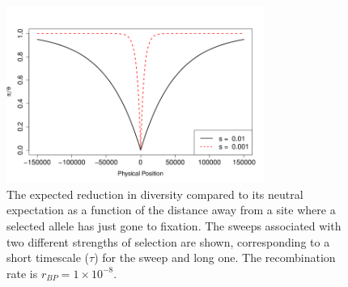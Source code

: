 \begin{figure}
\begin{center}
\includegraphics[width=0.75\textwidth]{figures/hitchhiking_reduction.png}
\end{center}
\caption{The expected reduction in diversity compared to its neutral expectation as
a function of the distance away from a site where a selected allele
has just gone to fixation. The sweeps associated with two different strengths of selection are shown, corresponding to a short timescale ($\tau$) for the sweep and long one. The recombination rate is $r_{BP}= 1\times
10^{-8}$.} \label{fig:hitchhiking_reduction}
\end{figure}



